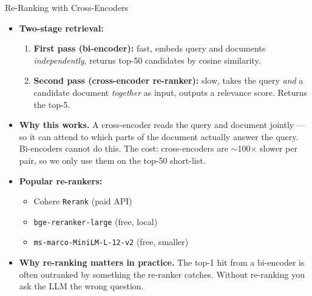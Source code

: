 \begin{frame}{Re-Ranking with Cross-Encoders}
\begin{itemize}
\item \textbf{Two-stage retrieval:}
\begin{enumerate}
    \item \textbf{First pass (bi-encoder):} fast, embeds query and documents \emph{independently}, returns top-50 candidates by cosine similarity.
    \item \textbf{Second pass (cross-encoder re-ranker):} slow, takes the query \emph{and} a candidate document \emph{together} as input, outputs a relevance score. Returns the top-5.
\end{enumerate}

\medskip
\item \textbf{Why this works.} A cross-encoder reads the query and document jointly --- so it can attend to which parts of the document actually answer the query. Bi-encoders cannot do this. The cost: cross-encoders are $\sim$100$\times$ slower per pair, so we only use them on the top-50 short-list.

\medskip
\item \textbf{Popular re-rankers:}
\begin{itemize}
    \item Cohere \texttt{Rerank} (paid API)
    \item \texttt{bge-reranker-large} (free, local)
    \item \texttt{ms-marco-MiniLM-L-12-v2} (free, smaller)
\end{itemize}

\medskip
\item \textbf{Why re-ranking matters in practice.} The top-1 hit from a bi-encoder is often outranked by something the re-ranker catches. Without re-ranking you ask the LLM the wrong question.
\end{itemize}
\end{frame}

